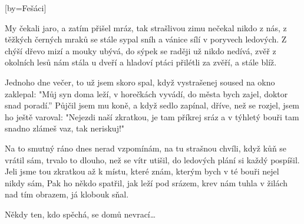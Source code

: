 [by={Fešáci}]

\beginverse{}
My čekali jaro, a zatím přišel mráz,
tak strašlivou zimu nečekal nikdo z nás,
z těžkých černých mraků se stále sypal sníh
a vánice sílí v poryvech ledových.
Z chýší dřevo mizí a mouky ubývá,
do sýpek se raději už nikdo nedívá,
zvěř z okolních lesů nám stála u dveří
a hladoví ptáci přilétli za zvěří, a stále blíž.
\endverse{}

\beginverse{}
Jednoho dne večer, to už jsem skoro spal,
když vystrašenej soused na okno zaklepal:
"Můj syn doma leží, v horečkách vyvádí,
do města bych zajel, doktor snad poradí.”
Půjčil jsem mu koně, a když sedlo zapínal,
dříve, než se rozjel, jsem ho ještě varoval:
"Nejezdi naší zkratkou, je tam příkrej sráz
a v týhletý bouři tam snadno zlámeš vaz, tak neriskuj!"
\endverse{}

\beginverse{}
Na to smutný ráno dnes nerad vzpomínám,
na tu strašnou chvíli, když kůň se vrátil sám,
trvalo to dlouho, než se vítr utišil,
do ledových plání si každý pospíšil.
Jeli jsme tou zkratkou až k místu, které znám,
kterým bych v té bouři nejel nikdy sám,
Pak ho někdo spatřil, jak leží pod srázem,
krev nám tuhla v žilách nad tím obrazem, já klobouk sňal.
\endverse{}

\beginverse*{}
Někdy ten, kdo spěchá, se domů nevrací\ldots{} 
\endverse{}

\endsong{}
